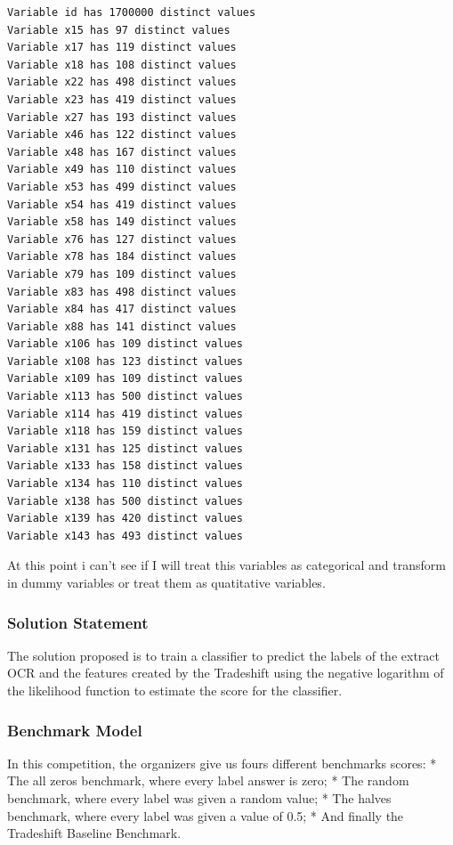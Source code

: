 \documentclass[11pt]{article}
\begin{document}
    \begin{Verbatim}[commandchars=\\\{\}]
Variable id has 1700000 distinct values
Variable x15 has 97 distinct values
Variable x17 has 119 distinct values
Variable x18 has 108 distinct values
Variable x22 has 498 distinct values
Variable x23 has 419 distinct values
Variable x27 has 193 distinct values
Variable x46 has 122 distinct values
Variable x48 has 167 distinct values
Variable x49 has 110 distinct values
Variable x53 has 499 distinct values
Variable x54 has 419 distinct values
Variable x58 has 149 distinct values
Variable x76 has 127 distinct values
Variable x78 has 184 distinct values
Variable x79 has 109 distinct values
Variable x83 has 498 distinct values
Variable x84 has 417 distinct values
Variable x88 has 141 distinct values
Variable x106 has 109 distinct values
Variable x108 has 123 distinct values
Variable x109 has 109 distinct values
Variable x113 has 500 distinct values
Variable x114 has 419 distinct values
Variable x118 has 159 distinct values
Variable x131 has 125 distinct values
Variable x133 has 158 distinct values
Variable x134 has 110 distinct values
Variable x138 has 500 distinct values
Variable x139 has 420 distinct values
Variable x143 has 493 distinct values

    \end{Verbatim}

    At this point i can't see if I will treat this variables as categorical
and transform in dummy variables or treat them as quatitative variables.

    \hypertarget{solution-statement}{%
\subsubsection{Solution Statement}\label{solution-statement}}

The solution proposed is to train a classifier to predict the labels of
the extract OCR and the features created by the Tradeshift using the
negative logarithm of the likelihood function to estimate the score for
the classifier.

    \hypertarget{benchmark-model}{%
\subsubsection{Benchmark Model}\label{benchmark-model}}

In this competition, the organizers give us fours different benchmarks
scores: * The all zeros benchmark, where every label answer is zero; *
The random benchmark, where every label was given a random value; * The
halves benchmark, where every label was given a value of 0.5; * And
finally the Tradeshift Baseline Benchmark.
\end{document}
